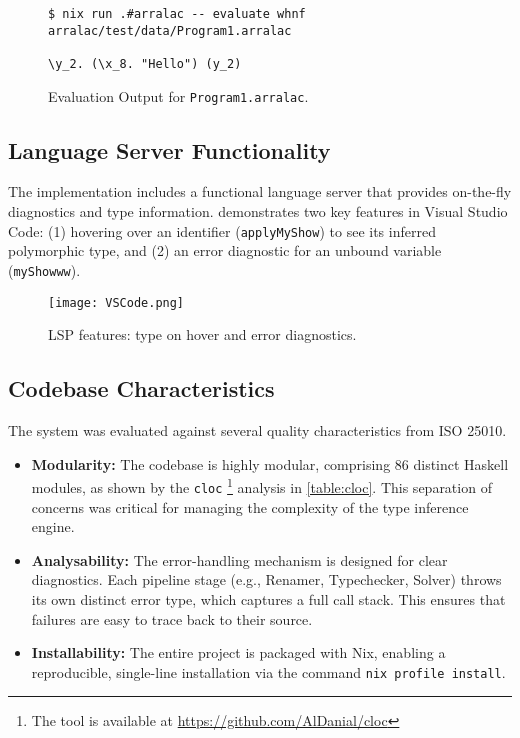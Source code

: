 \begin{figure}
  \centering
  \begin{verbatim}
$ nix run .#arralac -- evaluate whnf arralac/test/data/Program1.arralac

\y_2. (\x_8. "Hello") (y_2)
\end{verbatim}
  \caption{Evaluation Output for \texttt{Program1.arralac}.}
  \label{fig:evaluate-output}
\end{figure}

\subsection{Language Server Functionality}
The implementation includes a functional language server that provides on-the-fly diagnostics and type information.  demonstrates two key features in Visual Studio Code: (1) hovering over an identifier (\texttt{applyMyShow}) to see its inferred polymorphic type, and (2) an error diagnostic for an unbound variable (\texttt{myShowww}).

\begin{figure}[h!]
  \centering
  \texttt{[image: VSCode.png]}
  \caption{LSP features: type on hover and error diagnostics.}
  \label{fig:lsp-demo}
\end{figure}

\subsection{Codebase Characteristics}
The system was evaluated against several quality characteristics from ISO 25010.
\begin{itemize}
  \item \textbf{Modularity:} The codebase is highly modular, comprising 86 distinct Haskell modules, as shown by the \texttt{cloc} \footnote{The tool is available at \url{https://github.com/AlDanial/cloc}} analysis in \cref{table:cloc}. This separation of concerns was critical for managing the complexity of the type inference engine.
  \item \textbf{Analysability:} The error-handling mechanism is designed for clear diagnostics. Each pipeline stage (e.g., Renamer, Typechecker, Solver) throws its own distinct error type, which captures a full call stack. This ensures that failures are easy to trace back to their source.
  \item \textbf{Installability:} The entire project is packaged with Nix, enabling a reproducible, single-line installation via the command \texttt{nix profile install}.
\end{itemize}

